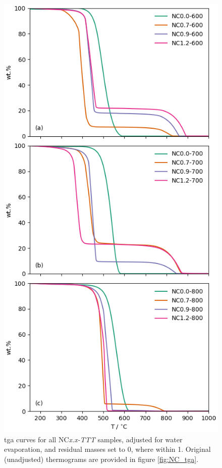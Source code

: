 \begin{figure}[htpb!]
    \centering
    \includegraphics[width=0.82\columnwidth, keepaspectratio]{4-impregnation/figs/NC_tga_adj.png}
    \caption{\acrshort{tga} curves for all NC\textit{x.x-TTT} samples, adjusted for water evaporation, and residual masses set to 0, where within \qty{1}{\wtpercent}. Original (unadjusted) thermograms are provided in figure \ref{fig:NC_tga}.}
    \label{fig:NC_tga_adj}
\end{figure}

